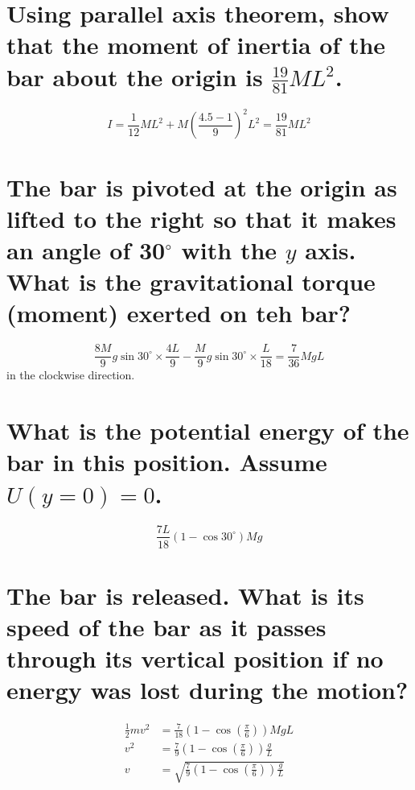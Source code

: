 \documentclass[answers]{exam}
\begin{document}
\begin{questions}
\begin{parts}
	\part{Using parallel axis theorem, show that the moment of inertia of the bar about the origin is $\frac{19}{81}ML^2$.}
	\begin{solution}
		$$I = \frac{1}{12}ML^2 + M\left(\frac{4.5-1}{9}\right)^2L^2 = \frac{19}{81}ML^2$$
	\end{solution}
	\part{The bar is pivoted at the origin as lifted to the right so that it makes an angle of 30$^\circ$ with the $y$ axis. What is the gravitational torque (moment) exerted on teh bar?}
	\begin{solution}
		$$\frac{8M}{9}g\sin30^\circ \times \frac{4L}{9} - \frac{M}{9} g\sin30^\circ \times \frac{L}{18} = \frac{7}{36}MgL$$
		in the clockwise direction.
	\end{solution}
	\part{What is the potential energy of the bar in this position. Assume $U(y=0) = 0$.}
	\begin{solution}
		$$\frac{7L}{18}\left(1 - \cos30^\circ\right)Mg$$
	\end{solution}
	\part{The bar is released. What is its speed of the bar as it passes through its vertical position if no energy was lost during the motion?}
	\begin{solution}
		\begin{align*}
			\frac{1}{2}mv^2 &= \frac{7}{18}\left(1 - \cos\left(\frac{\pi}{6}\right)\right)MgL \\
			v^2 &= \frac{7}{9}\left(1-\cos\left(\frac{\pi}{6}\right)\right)\frac{g}{L} \\
			v &= \sqrt{\frac{7}{9}\left(1-\cos\left(\frac{\pi}{6}\right)\right)\frac{g}{L}} \\
	\end{align*}
	\end{solution}
\end{parts}



\end{questions}
\end{document}
